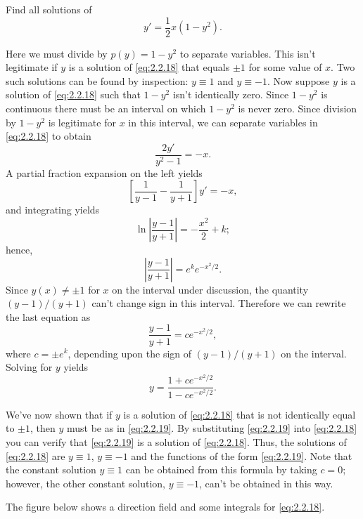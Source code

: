 \documentclass{ximera}
\begin{document}
\begin{example}\label{example:2.2.5}
Find all solutions of
\begin{equation} \label{eq:2.2.18}
y'=\frac{1}{2}x(1-y^2).
\end{equation}
 
\begin{explanation}
 
Here we must divide by $p(y)=1-y^2$ to separate variables.
This isn't  legitimate if $y$ is a solution of \eqref{eq:2.2.18} that
equals $\pm 1$ for some value of $x$. Two such solutions can be found
by inspection: $y \equiv 1$ and $y\equiv -1$. Now suppose
$y$ is a solution of \eqref{eq:2.2.18} such that $1-y^2$ isn't
identically zero. Since $1-y^2$ is continuous there must be an
interval on which $1-y^2$ is never zero. Since division by $1-y^2$ is
legitimate for $x$ in this interval, we can separate variables in
\eqref{eq:2.2.18} to obtain
$$
\frac{2y'}{y^2-1}=-x.
$$
 A partial fraction expansion on the left yields
$$
\left[\frac{1}{y-1}-\frac{1}{y+1}\right]y'=-x,
$$
and integrating  yields
$$
\ln\left|\frac{y-1}{y+1}\right|=-\frac{x^2}{2}+k;
$$
 hence,
$$
\left|\frac{y-1}{y+1}\right|=e^ke^{-x^2/2}.
$$
 Since $y(x)\neq \pm 1$ for $x$ on the interval under discussion, the
quantity
$(y-1)/(y+1)$  can't  change sign in this interval. Therefore
we can rewrite the last equation as
$$
\frac{y-1}{y+1}=ce^{-x^2/2},
$$
  where $c=\pm e^k$, depending upon the sign of $(y-1)/(y+1)$ on the
interval.
 Solving for  $y$ yields
\begin{equation} \label{eq:2.2.19}
y=\frac{1+ce^{-x^2/2}}{1-ce^{-x^2/2}}.
\end{equation}
 
We've now shown that if $y$ is a solution of \eqref{eq:2.2.18} that  is
not identically equal to $\pm 1$, then $y$ must be as in
\eqref{eq:2.2.19}. By substituting \eqref{eq:2.2.19} into \eqref{eq:2.2.18} you
 can verify that \eqref{eq:2.2.19} is  a solution of
\eqref{eq:2.2.18}. Thus,  the solutions of \eqref{eq:2.2.18}
are $y\equiv 1$, $y\equiv -1$ and the functions of the form
\eqref{eq:2.2.19}. Note that the constant solution $y \equiv 1$ can be
obtained from this formula by taking $c=0$;     however, the other
constant solution, $y \equiv -1$, can't be obtained in this way.
 
The figure below shows a direction field and some integrals for
\eqref{eq:2.2.18}.
 
 

\begin{center}
\end{center}
\end{explanation}
\end{example}
 
\end{document}

